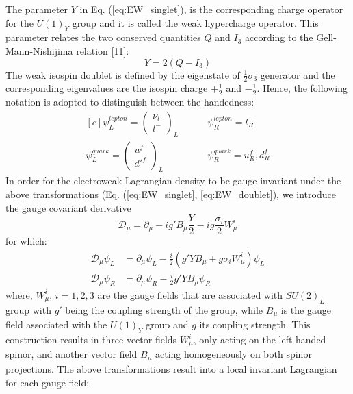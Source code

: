 The parameter $Y$ in Eq. (\ref{eq:EW_singlet}), is the corresponding charge operator for the $U(1)_Y$ group and it is called the weak hypercharge operator. This parameter relates the two conserved quantities $Q$ and $I_3$ according to the Gell-Mann-Nishijima relation [11]:
\begin{equation}
    Y = 2(Q-I_3)
\end{equation}
The weak isospin doublet is defined by the eigenstate of $\frac{1}{2}\sigma_3$ generator and the corresponding eigenvalues are the isospin charge $+\frac{1}{2}$ and $-\frac{1}{2}$. Hence, the following notation is adopted to distinguish between the handedness:
\begin{equation}
    \begin{aligned}[c]
        \psi_L^{lepton} = \begin{pmatrix}
            \nu_l \\
            l^-
        \end{pmatrix}_L \: \: \: \: \: \: \: \: \: \: & \psi_R^{lepton}=l_R^- \\
        \psi_L^{quark} = 
        \begin{pmatrix}
            u^f \\
            d'^f
        \end{pmatrix}_L \: \: \: \: \: \: \: \: \: \:&\psi_R^{quark}=u^f_R, d^f_R
    \end{aligned}
\end{equation}
In order for the electroweak Lagrangian density to be gauge invariant under the above transformations (Eq. (\ref{eq:EW_singlet}, \ref{eq:EW_doublet}), we introduce the gauge covariant derivative
\begin{equation}
    \mathscr{D}_\mu = \partial_\mu - ig'B_\mu \frac{Y}{2} - i g\frac{\sigma_i}{2}W_\mu^i
\end{equation}
for which:
\begin{align}
    \mathscr{D}_\mu \psi_L &= \partial_\mu \psi_L - \frac{i}{2}(g'YB_\mu + g \sigma_iW^i_\mu)\psi_L \\
    \mathscr{D}_\mu \psi_R &= \partial_\mu \psi_R - \frac{i}{2}g'YB_\mu \psi_R
\end{align}
where, $W^i_\mu$, $i = 1, 2, 3$ are the gauge fields that are associated with $SU(2)_L$ group with $g'$ being the coupling strength of the group, while $B_\mu$ is the gauge field associated with the $U(1)_Y$ group and $g$ its coupling strength. This construction results in three vector fields $W^i_\mu$, only acting on the left-handed spinor, and another vector field $B_\mu$ acting homogeneously on both spinor projections. The above transformations result into a local invariant Lagrangian for each gauge field:
